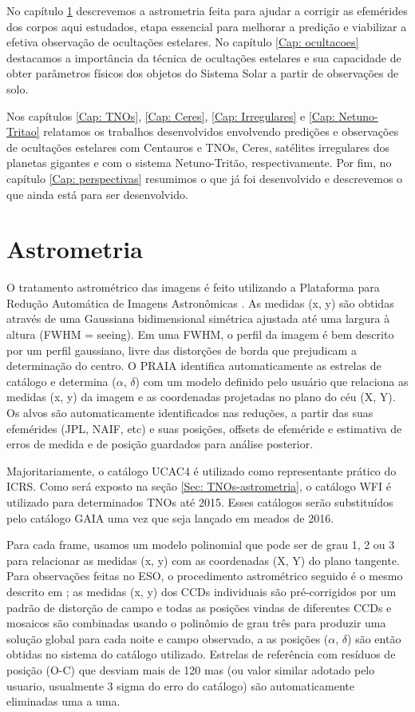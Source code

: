 \documentclass[12pt,a4paper]{monografia}
\begin{document}
No capítulo \ref{Cap: Astrometria} descrevemos a astrometria feita para ajudar a corrigir as efemérides dos corpos aqui estudados, etapa essencial para melhorar a predição e viabilizar a efetiva observação de ocultações estelares. No capítulo \ref{Cap: ocultacoes} destacamos a importância da técnica de ocultações estelares e sua capacidade de obter parâmetros físicos dos objetos do Sistema Solar a partir de observações de solo.

Nos capítulos \ref{Cap: TNOs}, \ref{Cap: Ceres}, \ref{Cap: Irregulares} e \ref{Cap: Netuno-Tritao} relatamos os trabalhos desenvolvidos envolvendo predições e observações de ocultações estelares com Centauros e TNOs, Ceres, satélites irregulares dos planetas gigantes e com o sistema Netuno-Tritão, respectivamente. Por fim, no capítulo \ref{Cap: perspectivas} resumimos o que já foi desenvolvido e descrevemos o que ainda está para ser desenvolvido.


\chapter{Astrometria}
\label{Cap: Astrometria}


\indent \indent O tratamento astrométrico das imagens é feito utilizando a Plataforma para Redução Automática de Imagens Astronômicas \citep[PRAIA][]{Assafin2011}. As medidas (x, y) são obtidas através de uma Gaussiana bidimensional simétrica ajustada até uma largura à altura (FWHM = seeing). Em uma FWHM, o perfil da imagem é bem descrito por um perfil gaussiano, livre das distorções de borda que prejudicam a determinação do centro. O PRAIA identifica automaticamente as estrelas de catálogo e determina ($\alpha$, $\delta$) com um modelo definido pelo usuário que relaciona as medidas (x, y) da imagem e as coordenadas projetadas no plano do céu (X, Y). Os alvos são automaticamente identificados nas reduções, a partir das suas efemérides (JPL, NAIF, etc) e suas posições, offsets de efeméride e estimativa de erros de medida e de posição guardados para análise posterior.

Majoritariamente, o catálogo UCAC4 \citep{Zacharias2013} é utilizado como representante prático do ICRS. Como será exposto na seção \ref{Sec: TNOs-astrometria}, o catálogo WFI é utilizado para determinados TNOs até 2015. Esses catálogos serão substituídos pelo catálogo GAIA uma vez que seja lançado em meados de 2016.

Para cada frame, usamos um modelo polinomial que pode ser de grau 1, 2 ou 3 para relacionar as medidas (x, y) com as coordenadas (X, Y) do plano tangente. Para observações feitas no ESO, o procedimento astrométrico seguido é o mesmo descrito em \citep{Assafin2012}; as medidas (x, y) dos CCDs individuais são pré-corrigidos por um padrão de distorção de campo e todas as posições vindas de diferentes CCDs e mosaicos são combinadas usando o polinômio de grau três para produzir uma solução global para cada noite e campo observado, a as posições ($\alpha$, $\delta$) são então obtidas no sistema do catálogo utilizado. Estrelas de referência com resíduos de posição (O-C) que desviam mais de 120 mas (ou valor similar adotado pelo usuario, usualmente 3 sigma do erro do catálogo) são automaticamente eliminadas uma a uma.
\end{document}

